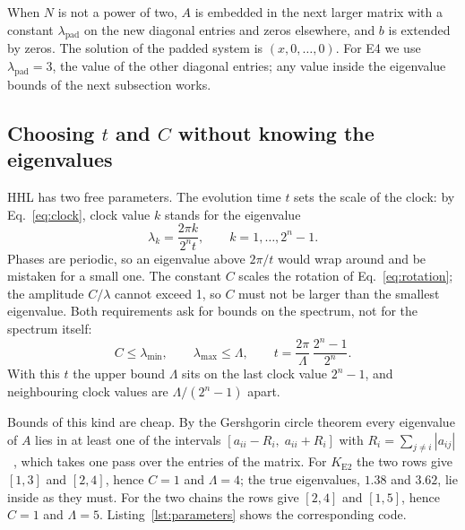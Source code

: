 \documentclass[manuscript,screen,review,nonacm]{acmart}
\newcommand{\code}[1]{\texttt{#1}}
\begin{document}
When $N$ is not a power of two, $A$ is embedded in the next larger matrix
with a constant $\lambda_{\mathrm{pad}}$ on the new diagonal entries and zeros
elsewhere, and $b$ is extended by zeros. The solution of the padded system is
$(x,0,\dots,0)$. For E4 we use $\lambda_{\mathrm{pad}}=3$, the value of the
other diagonal entries; any value inside the eigenvalue bounds of the next
subsection works.

\subsection{Choosing \texorpdfstring{$t$ and $C$}{t and C} without knowing the eigenvalues}
\label{sec:parameters}

HHL has two free parameters. The evolution time $t$ sets the scale of the
clock: by Eq.~\eqref{eq:clock}, clock value $k$ stands for the eigenvalue
\begin{equation}
  \lambda_k=\frac{2\pi k}{2^n t},\qquad k=1,\dots,2^n-1.
  \label{eq:lambdak}
\end{equation}
Phases are periodic, so an eigenvalue above $2\pi/t$ would wrap around and be
mistaken for a small one. The constant $C$ scales the rotation of
Eq.~\eqref{eq:rotation}; the amplitude $C/\lambda$ cannot exceed 1, so $C$
must not be larger than the smallest eigenvalue. Both requirements ask for
bounds on the spectrum, not for the spectrum itself:
\begin{equation}
  C\le\lambda_{\min},\qquad \lambda_{\max}\le\Lambda,\qquad
  t=\frac{2\pi}{\Lambda}\,\frac{2^n-1}{2^n}.
  \label{eq:tchoice}
\end{equation}
With this $t$ the upper bound $\Lambda$ sits on the last clock value
$2^n-1$, and neighbouring clock values are $\Lambda/(2^n-1)$ apart.

Bounds of this kind are cheap. By the Gershgorin circle theorem every
eigenvalue of $A$ lies in at least one of the intervals
$[a_{ii}-R_i,\;a_{ii}+R_i]$ with $R_i=\sum_{j\ne i}|a_{ij}|$~\cite{horn2012},
which takes one pass over the entries of the matrix. For $K_{\mathrm{E2}}$
the two rows give $[1,3]$ and $[2,4]$, hence $C=1$ and $\Lambda=4$; the true
eigenvalues, $1.38$ and $3.62$, lie inside as they must. For the two chains the
rows give $[2,4]$ and $[1,5]$, hence $C=1$ and $\Lambda=5$.
Listing~\ref{lst:parameters} shows the corresponding code.


\end{document}
